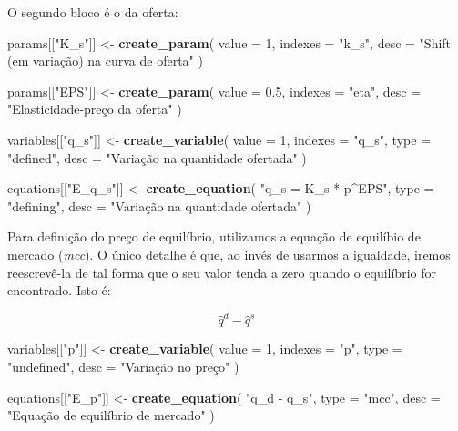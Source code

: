 \documentclass[12pt,twoside]{article}
\newenvironment{Shaded}{\begin{snugshade}}{\end{snugshade}}
\newcommand{\DataTypeTok}[1]{\textcolor[rgb]{0.13,0.29,0.53}{#1}}
\newcommand{\DecValTok}[1]{\textcolor[rgb]{0.00,0.00,0.81}{#1}}
\newcommand{\FloatTok}[1]{\textcolor[rgb]{0.00,0.00,0.81}{#1}}
\newcommand{\KeywordTok}[1]{\textcolor[rgb]{0.13,0.29,0.53}{\textbf{#1}}}
\newcommand{\NormalTok}[1]{#1}
\newcommand{\StringTok}[1]{\textcolor[rgb]{0.31,0.60,0.02}{#1}}
\let\oldShaded\Shaded
\let\endoldShaded\endShaded
\renewenvironment{Shaded}{\footnotesize\oldShaded}{\endoldShaded}
\begin{document}
O segundo bloco é o da oferta:

\begin{Shaded}
\begin{Highlighting}[]
\NormalTok{params[[}\StringTok{"K_s"}\NormalTok{]] <-}\StringTok{ }\KeywordTok{create_param}\NormalTok{(}
  \DataTypeTok{value =} \DecValTok{1}\NormalTok{,}
  \DataTypeTok{indexes =} \StringTok{"k_s"}\NormalTok{,}
  \DataTypeTok{desc =} \StringTok{"Shift (em variação) na curva de oferta"}
\NormalTok{)}

\NormalTok{params[[}\StringTok{"EPS"}\NormalTok{]] <-}\StringTok{ }\KeywordTok{create_param}\NormalTok{(}
  \DataTypeTok{value =} \FloatTok{0.5}\NormalTok{,}
  \DataTypeTok{indexes =} \StringTok{"eta"}\NormalTok{,}
  \DataTypeTok{desc =} \StringTok{"Elasticidade-preço da oferta"}
\NormalTok{)}

\NormalTok{variables[[}\StringTok{"q_s"}\NormalTok{]] <-}\StringTok{ }\KeywordTok{create_variable}\NormalTok{(}
  \DataTypeTok{value =} \DecValTok{1}\NormalTok{,}
  \DataTypeTok{indexes =} \StringTok{"q_s"}\NormalTok{,}
  \DataTypeTok{type =} \StringTok{"defined"}\NormalTok{,}
  \DataTypeTok{desc =} \StringTok{"Variação na quantidade ofertada"}
\NormalTok{)}

\NormalTok{equations[[}\StringTok{"E_q_s"}\NormalTok{]] <-}\StringTok{ }\KeywordTok{create_equation}\NormalTok{(}
  \StringTok{"q_s = K_s * p^EPS"}\NormalTok{,}
  \DataTypeTok{type =} \StringTok{"defining"}\NormalTok{,}
  \DataTypeTok{desc =} \StringTok{"Variação na quantidade ofertada"}
\NormalTok{)}
\end{Highlighting}
\end{Shaded}

Para definição do preço de equilíbrio, utilizamos a equação de equilíbio
de mercado (\emph{mcc}). O único detalhe é que, ao invés de usarmos a
igualdade, iremos reescrevê-la de tal forma que o seu valor tenda a zero
quando o equilíbrio for encontrado. Isto é:

\[\hat{q}^d - \hat{q}^s\]

\begin{Shaded}
\begin{Highlighting}[]
\NormalTok{variables[[}\StringTok{"p"}\NormalTok{]] <-}\StringTok{ }\KeywordTok{create_variable}\NormalTok{(}
  \DataTypeTok{value =} \DecValTok{1}\NormalTok{,}
  \DataTypeTok{indexes =} \StringTok{"p"}\NormalTok{,}
  \DataTypeTok{type =} \StringTok{"undefined"}\NormalTok{,}
  \DataTypeTok{desc =} \StringTok{"Variação no preço"}
\NormalTok{)}

\NormalTok{equations[[}\StringTok{"E_p"}\NormalTok{]] <-}\StringTok{ }\KeywordTok{create_equation}\NormalTok{(}
  \StringTok{"q_d - q_s"}\NormalTok{,}
  \DataTypeTok{type =} \StringTok{"mcc"}\NormalTok{,}
  \DataTypeTok{desc =} \StringTok{"Equação de equilíbrio de mercado"}
\NormalTok{)}
\end{Highlighting}
\end{Shaded}
\end{document}
